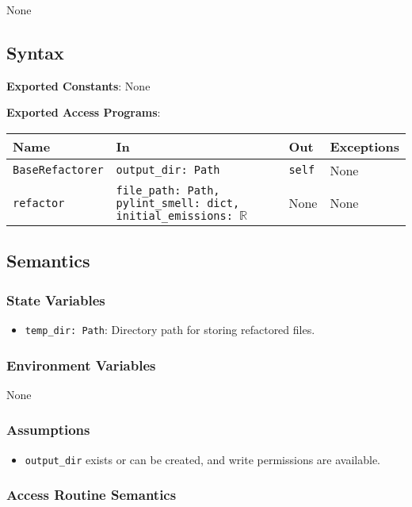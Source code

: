 \documentclass[12pt, titlepage]{article}
\begin{document}
None

\subsection{Syntax}
\noindent
\textbf{Exported Constants}: None

\noindent
\textbf{Exported Access Programs}:

\begin{tabularx}{\linewidth}{|l|>{\raggedright\arraybackslash}X|l|l|}
  \hline
  \textbf{Name} & \textbf{In} & \textbf{Out} & \textbf{Exceptions} \\\hline
  \texttt{BaseRefactorer} & \texttt{output\_dir: Path} & \texttt{self} & None \\\hline
  \texttt{refactor} & \texttt{file\_path: Path, pylint\_smell: dict, initial\_emissions: $\mathbb{R}$} & None & None \\
  \hline
\end{tabularx}

\subsection{Semantics}

\subsubsection{State Variables}
\begin{itemize}
  \item \texttt{temp\_dir: Path}: Directory path for storing refactored files.
\end{itemize}

\subsubsection{Environment Variables}
None

\subsubsection{Assumptions}
\begin{itemize}
  \item \texttt{output\_dir} exists or can be created, and write permissions are available.
\end{itemize}

\subsubsection{Access Routine Semantics}
\end{document}
